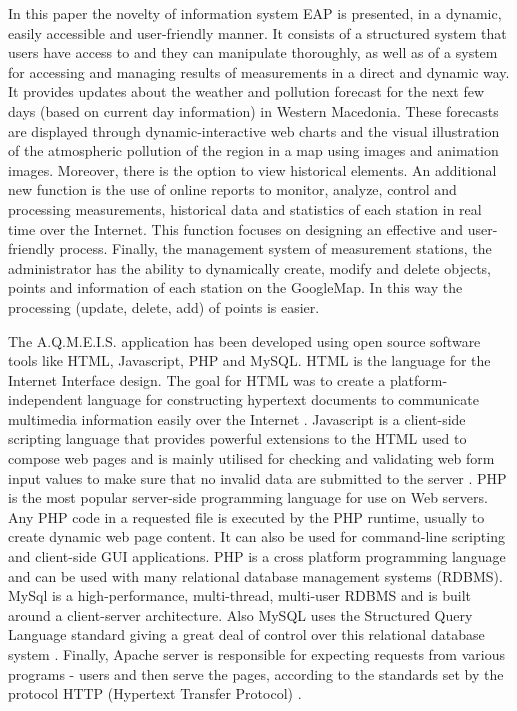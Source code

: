 \documentclass[conference]{IEEEtran}
\begin{document}
In this paper the novelty of information system EAP is presented, in a dynamic, easily accessible and user-friendly manner. It consists of a structured system that users have access to and they can manipulate thoroughly, as well as of a system for accessing and managing results of measurements in a direct and dynamic way. It provides updates about the weather and pollution forecast for the next few days (based on current day information) in Western Macedonia. These forecasts are displayed through dynamic-interactive web charts and the visual illustration of the atmospheric pollution of the region in a map using images and animation images. Moreover, there is the option to view historical elements. An additional new function is the use of online reports to monitor, analyze, control and processing measurements, historical data and statistics of each station in real time over the Internet. This function focuses on designing an effective and user-friendly process.
Finally, the management system of measurement stations, the administrator has the ability to dynamically create, modify and delete objects, points and information of each station on the GoogleMap. In this way the processing (update, delete, add) of points is easier.


The A.Q.M.E.I.S.  application has been developed using open source software tools like HTML, Javascript, PHP and MySQL. HTML is the language for the Internet Interface design. The goal for HTML was to create a platform-independent language for constructing hypertext documents to communicate multimedia information easily over the Internet \cite {web2008}.  Javascript is a client-side scripting language that provides powerful extensions to the HTML used to compose web pages and is mainly utilised  for checking and validating web form input values to make sure that no invalid data are submitted to the server  \cite {Java1}. PHP is the most popular server-side programming language for use on Web servers.  Any PHP code in a requested file is executed by the PHP runtime, usually to create dynamic web page content. It can also be used for command-line scripting and client-side GUI applications. PHP is a cross platform programming language and  can be used with many relational database management systems (RDBMS)\cite {php1}. MySql is a high-performance, multi-thread, multi-user RDBMS  and is built around a client-server architecture.  Also MySQL uses the Structured Query Language standard giving a great deal of control over this relational database system  \cite  {mysql}. Finally, Apache server is responsible for expecting requests from various programs - users and then serve the pages, according to the standards set by the protocol HTTP (Hypertext Transfer Protocol) \cite {apache}.
 
\end{document}

